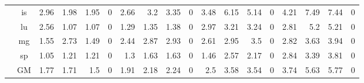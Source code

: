 \begin{table*}[]
\begin{center}
{\begin{tabular}{|c|c|rrrr|rrrr|rrrr|rrrr|}
 & is &           2.96 &           1.98 &          1.95 &              0 &         2.66 &            3.2 &          3.35 &              0 &          3.48 &            6.15 &           5.14 &               0 &          4.21 &            7.49 &           7.44 &               0 \\
 & lu &           2.56 &           1.07 &          1.07 &              0 &         1.29 &           1.35 &          1.38 &              0 &          2.97 &            3.21 &           3.24 &               0 &          2.81 &             5.2 &           5.21 &               0 \\
 & mg &           1.55 &           2.73 &          1.49 &              0 &         2.44 &           2.87 &          2.93 &              0 &          2.61 &            2.95 &            3.5 &               0 &          2.82 &            3.63 &           3.94 &               0 \\
 & sp &           1.05 &           1.21 &          1.21 &              0 &          1.3 &           1.63 &          1.63 &              0 &          1.46 &            2.57 &           2.17 &               0 &          2.84 &            3.39 &           3.81 &               0 \\ \cline{2-18}
 & GM &           1.77 &           1.71 &           1.5 &              0 &         1.91 &           2.18 &          2.24 &              0 &           2.5 &            3.58 &           3.54 &               0 &          3.74 &            5.63 &           5.77 &               0 \\ 
\hline
\end{tabular}
}
\end{center}
\end{table*}




